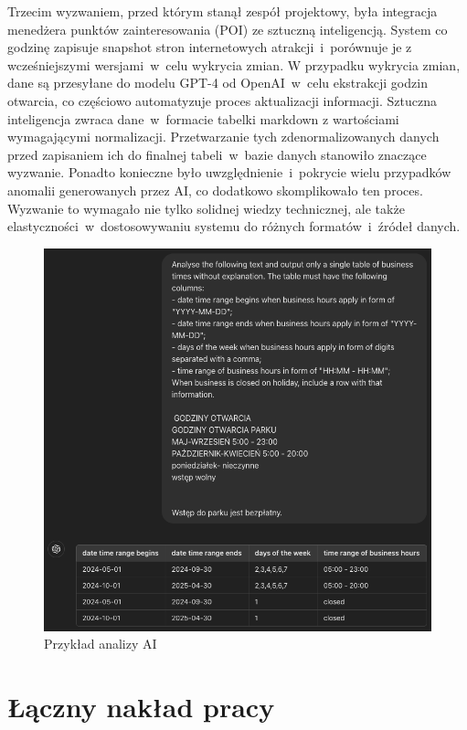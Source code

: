 Trzecim wyzwaniem, przed którym stanął zespół projektowy, była integracja menedżera punktów zainteresowania (POI) ze sztuczną inteligencją.
System co godzinę zapisuje snapshot stron internetowych atrakcji~i~porównuje je z wcześniejszymi wersjami~w~celu wykrycia zmian. \newline
W przypadku wykrycia zmian, dane są przesyłane do modelu GPT-4 od OpenAI~w~celu ekstrakcji godzin otwarcia, co częściowo automatyzuje proces aktualizacji informacji.
Sztuczna inteligencja zwraca dane~w~formacie tabelki markdown z wartościami wymagającymi normalizacji.
Przetwarzanie tych zdenormalizowanych danych przed zapisaniem ich do finalnej tabeli~w~bazie danych stanowiło znaczące wyzwanie.
Ponadto konieczne było uwzględnienie~i~pokrycie wielu przypadków anomalii generowanych przez AI, co dodatkowo skomplikowało ten proces.
Wyzwanie to wymagało nie tylko solidnej wiedzy technicznej, ale także elastyczności~w~dostosowywaniu systemu do różnych formatów~i~źródeł danych.

\begin{figure}[H]
    \centering
    \includegraphics[width=1\textwidth]{attachments/t2}
    \caption{Przykład analizy AI}
\end{figure}

\section{Łączny nakład pracy}
\label{sec:laczny-naklad-pracy}

